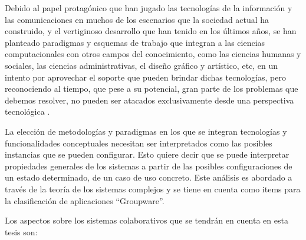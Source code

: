 Debido al papel protagónico que han
jugado las tecnologías de la información y
las comunicaciones en muchos de los
escenarios que la sociedad actual ha
construido, y el vertiginoso desarrollo que
han tenido en los últimos años, se han
planteado paradigmas y esquemas de
trabajo que integran a las ciencias
computacionales con otros campos del
conocimiento, como las ciencias humanas
y sociales, las ciencias administrativas, el
diseño gráfico y artístico, etc, en un
intento por aprovechar el soporte que
pueden brindar dichas tecnologías, pero
reconociendo al tiempo, que pese a su
potencial, gran parte de los problemas
que debemos resolver, no pueden ser
atacados exclusivamente desde una
perspectiva tecnológica \cite{cap1.2,cap1.3}. 

La elección de metodologías y paradigmas en los que se integran tecnologías
y funcionalidades conceptuales necesitan ser interpretados como las posibles
instancias que se pueden configurar. Esto quiere decir que se puede interpretar
propiedades generales de los sistemas a partir de las posibles configuraciones
de un estado determinado, de un caso de uso concreto. Este análisis es abordado
a través de la teoría de los sistemas complejos y se tiene en cuenta como
items para la clasificación de aplicaciones ``Groupware''.


Los aspectos sobre los sistemas colaborativos que se tendrán en cuenta en esta
tesis son:


